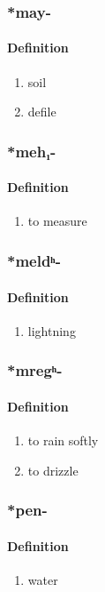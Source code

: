 \subsubsection{\**may-}
\paragraph{Definition}
\begin{enumerate}
\item soil
\item defile
\end{enumerate}
\subsubsection{\**meh₁-}
\paragraph{Definition}
\begin{enumerate}
\item to measure
\end{enumerate}
\subsubsection{\**meldʰ-}
\paragraph{Definition}
\begin{enumerate}
\item lightning
\end{enumerate}
\subsubsection{\**mregʰ-}
\paragraph{Definition}
\begin{enumerate}
\item to rain softly
\item to drizzle
\end{enumerate}
\subsubsection{\**pen-}
\paragraph{Definition}
\begin{enumerate}
\item water
\end{enumerate}
